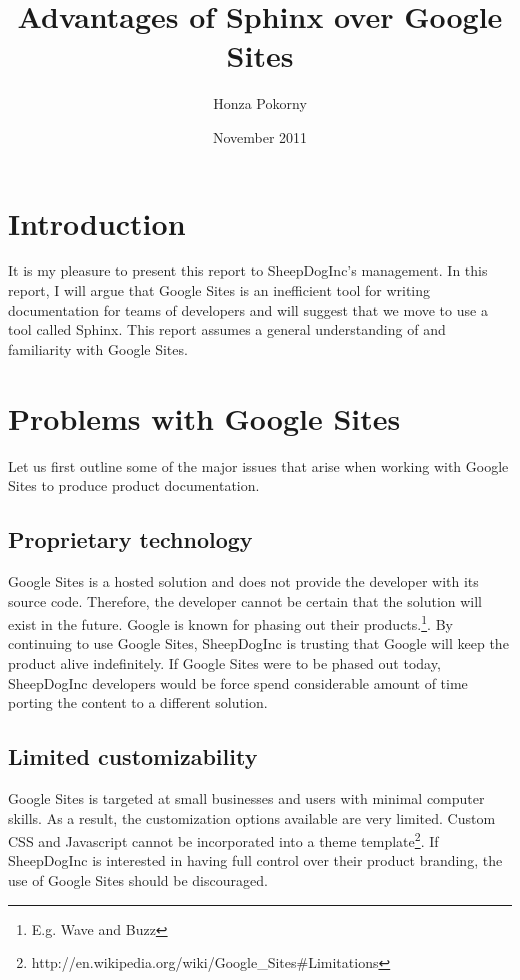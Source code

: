 \documentclass[letterpaper]{report}
\begin{document}
\title{Advantages of Sphinx over Google Sites}
\author{Honza Pokorny}
\date{November 2011}
\maketitle

\section*{Introduction}
    
    It is my pleasure to present this report to SheepDogInc's management. In
    this report, I will argue that Google Sites is an inefficient tool for
    writing documentation for teams of developers and will suggest that we move
    to use a tool called Sphinx. This report assumes a general understanding of
    and familiarity with Google Sites. 

\section*{Problems with Google Sites}

    Let us first outline some of the major issues that arise when working with
    Google Sites to produce product documentation.

    \subsection*{Proprietary technology}

        Google Sites is a hosted solution and does not provide the developer
        with its source code. Therefore, the developer cannot be certain that
        the solution will exist in the future. Google is known for 
        phasing out their products.\footnote{E.g. Wave and Buzz}.
        By continuing to use Google Sites, SheepDogInc is trusting that Google
        will keep the product alive indefinitely. If Google Sites were to be
        phased out today, SheepDogInc developers would be force spend
        considerable amount of time porting the content to a different
        solution.

    \subsection*{Limited customizability}
        
        Google Sites is targeted at small businesses and users with minimal
        computer skills. As a result, the customization options available are
        very limited. Custom CSS and Javascript cannot be incorporated into a theme 
        template\footnote{http://en.wikipedia.org/wiki/Google\_Sites\#Limitations}.
        If SheepDogInc is interested in having full control over their product
        branding, the use of Google Sites should be discouraged.
\end{document}
